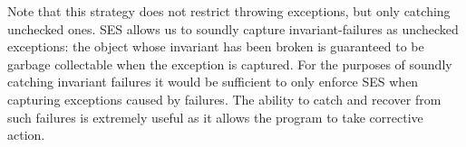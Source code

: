 
Note that this strategy does not restrict throwing exceptions, but only catching unchecked ones.
SES allows us to soundly capture invariant-failures as unchecked exceptions: 
the object whose invariant has been broken is guaranteed to be garbage collectable when the exception is captured. For the purposes of soundly catching invariant failures it would be sufficient to only enforce SES when capturing exceptions caused by \Q@invariant@ failures.
The ability to catch and recover from such failures is extremely useful as it allows the program to take corrective action.





% 



\loseSpace


